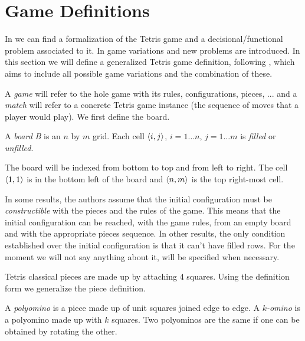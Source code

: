 \section{Game Definitions}

In \cite{TIH} we can find a formalization of the Tetris game and a decisional/functional problem associated to it. In \cite{TT,TWFP,TCB,CTV,AVG} game variations and new problems are introduced. In this section we will define a generalized Tetris game definition, following \cite{TIH}, which aims to include all possible game variations and the combination of these. 

A \emph{game} will refer to the hole game with its rules, configurations, pieces, ... and a \emph{match} will refer to a concrete Tetris game instance (the sequence of moves that a player would play). We first define the board.

\begin{definition} 
  A \emph{board} \emph{B} is an $n$ by $m$ grid. Each cell $\cell$, $i = 1\dots n$, $j = 1\dots m$ is \emph{filled} or \emph{unfilled}.
\end{definition}

The board will be indexed from bottom to top and from left to right. The cell $\cell[1][1]$ is in the bottom left of the board and $\cell[n][m]$ is the top right-most cell.

In some results, the authors assume that the initial configuration must be \emph{constructible}  with the pieces and the rules of the game. This means that the initial configuration can be reached, with the game rules, from an empty board and with the appropriate pieces sequence. In other results, the only condition established over the initial configuration is that it can't have filled rows. For the moment we will not say anything about it, will be specified when necessary.
\vspace{10px}

Tetris classical pieces are made up by attaching 4 squares. Using the definition form \cite{TT, WikiFandom} we generalize the piece definition.

\begin{definition}  
  A \emph{polyomino} is a piece made up of unit squares joined edge to edge. A \emph{$k$-omino} is a polyomino made up with $k$ squares. Two polyominos are the same if one can be obtained by rotating the other. 
\end{definition}


